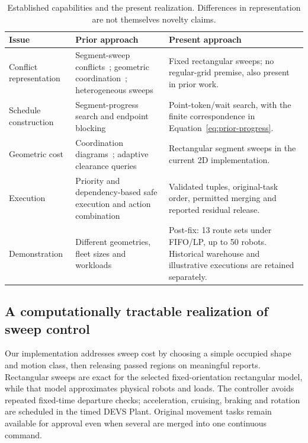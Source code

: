 \documentclass[11pt,a4paper]{article}
\theoremstyle{remark}
\begin{document}
\begin{table}[htbp]
\centering\small
\caption{Established capabilities and the present realization. Differences
in representation are not themselves novelty claims.}
\label{tab:literature-comparison}
\begin{tabular}{p{.22\linewidth}p{.34\linewidth}p{.35\linewidth}}
\toprule
Issue & Prior approach & Present approach\\
\midrule
Conflict representation & Segment-sweep conflicts~\cite{odonnell1989};
geometric coordination~\cite{leroy1999}; heterogeneous sweeps~\cite{scale2026}
& Fixed rectangular sweeps; no regular-grid premise, also present in prior work.\\[4pt]
Schedule construction & Segment-progress search and endpoint blocking~\cite{odonnell1989}
& Point-token/wait search, with the finite correspondence in
Equation~\eqref{eq:prior-progress}.\\[4pt]
Geometric cost & Coordination diagrams~\cite{leroy1999}; adaptive
clearance queries~\cite{ablad2021} & Rectangular segment sweeps in the
current 2D implementation.\\[4pt]
Execution & Priority and dependency-based safe
execution and action combination~\cite{gregoire2015,cap2016,hoenig2019,berndt2024,scale2026} & Validated tuples,
original-task order, permitted merging and reported residual release.\\[4pt]
Demonstration & Different geometries, fleet sizes and workloads &
Post-fix: 13 route sets under FIFO/LP, up to 50 robots. Historical warehouse
and illustrative executions are retained separately.\\
\bottomrule
\end{tabular}
\end{table}

\subsection{A computationally tractable realization of sweep control}
Our implementation addresses sweep cost by choosing a simple occupied
shape and motion class, then releasing passed regions on meaningful
reports. Rectangular sweeps are exact for the selected fixed-orientation
rectangular model, while that model approximates physical robots and
loads. The controller avoids repeated fixed-time departure checks;
acceleration, cruising, braking and rotation are scheduled in the timed
DEVS Plant. Original movement tasks remain available for approval even
when several are merged into one continuous command.
\end{document}
